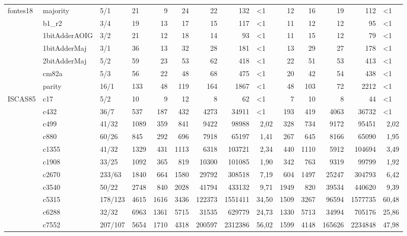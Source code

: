 \begin{sidewaystable}[htbp]
{\begin{tabular}{|r|l|l|l|r|r|r|r|r|r|r|r|r|r|}
		\midrule
		\multicolumn{1}{|l|}{fontes18} & majority & 5/1   & 21    & 9     & 24    & 22    & 132   & \multicolumn{1}{l|}{<1} & 12    & 16    & 19    & 112   & \multicolumn{1}{l|}{<1} \\
		& b1\_r2 & 3/4   & 19    & 13    & 17    & 15    & 117   & \multicolumn{1}{l|}{<1} & 11    & 12    & 12    & 95    & \multicolumn{1}{l|}{<1} \\
		& 1bitAdderAOIG & 3/2   & 21    & 12    & 18    & 14    & 93    & \multicolumn{1}{l|}{<1} & 11    & 15    & 12    & 79    & \multicolumn{1}{l|}{<1} \\
		& 1bitAdderMaj & 3/1   & 36    & 13    & 32    & 28    & 181   & \multicolumn{1}{l|}{<1} & 13    & 29    & 27    & 178   & \multicolumn{1}{l|}{<1} \\
		& 2bitAdderMaj & 5/2   & 59    & 23    & 53    & 62    & 418   & \multicolumn{1}{l|}{<1} & 22    & 51    & 53    & 413   & \multicolumn{1}{l|}{<1} \\
		& cm82a & 5/3   & 56    & 22    & 48    & 68    & 475   & \multicolumn{1}{l|}{<1} & 20    & 42    & 54    & 438   & \multicolumn{1}{l|}{<1} \\
		& parity & 16/1  & 133   & 48    & 119   & 164   & 1867  & \multicolumn{1}{l|}{<1} & 48    & 103   & 72    & 2212  & \multicolumn{1}{l|}{<1} \\
		\midrule
		\multicolumn{1}{|l|}{ISCAS85} & c17   & 5/2   & 10    & 9     & 12    & 8     & 62    & \multicolumn{1}{l|}{<1} & 7     & 10    & 8     & 44    & \multicolumn{1}{l|}{<1} \\
		& c432  & 36/7  & 537   & 187   & 432   & 4273  & 34911 & \multicolumn{1}{l|}{<1} & 193   & 419   & 4063  & 36732 & \multicolumn{1}{l|}{<1} \\
		& c499  & 41/32 & 1089  & 359   & 841   & 9422  & 98988 & 2,02  & 328   & 734   & 9172  & 95451 & 2,02 \\
		& c880  & 60/26 & 845   & 292   & 696   & 7918  & 65197 & 1,41  & 267   & 645   & 8166  & 65090 & 1,95 \\
		& c1355 & 41/32 & 1329  & 431   & 1113  & 6318  & 103721 & 2,34  & 440   & 1110  & 5912  & 104694 & 3,49 \\
		& c1908 & 33/25 & 1092  & 365   & 819   & 10300 & 101085 & 1,90  & 342   & 763   & 9319  & 99799 & 1,92 \\
		& c2670 & 233/63 & 1840  & 664   & 1580  & 29792 & 308518 & 7,19  & 604   & 1497  & 25247 & 304793 & 6,42 \\
		& c3540 & 50/22 & 2748  & 840   & 2028  & 41794 & 433132 & 9,71  & 1949  & 820   & 39534 & 440620 & 9,39 \\
		& c5315 & 178/123 & 4615  & 1616  & 3436  & 122373 & 1551411 & 34,50 & 1509  & 3267  & 96594 & 1577735 & 60,48 \\
		& c6288 & 32/32 & 6963  & 1361  & 5715  & 31535 & 629779 & 24,73 & 1330  & 5713  & 34994 & 705176 & 25,86 \\
		& c7552 & 207/107 & 5654  & 1710  & 4318  & 200597 & 2312386 & 56,02 & 1599  & 4148  & 165626 & 2234848 & 47,98 \\
		\bottomrule
	\end{tabular}}%


\end{sidewaystable}

